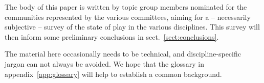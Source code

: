 \documentclass{article}
\begin{document}
The body of this paper is written by topic group members nominated for
the communities represented by the various committees, aiming for a --
necessarily subjective -- survey of the state of play in the various
disciplines.  This survey will then inform some preliminary conclusions
in sect.~\ref{sect:conclusions}.

The material here occasionally needs to be technical, and
discipline-specific jargon can not always be avoided.  We hope that the
glossary in appendix~\ref{app:glossary} will help to establish a common
background.



















\appendix


\end{document}
